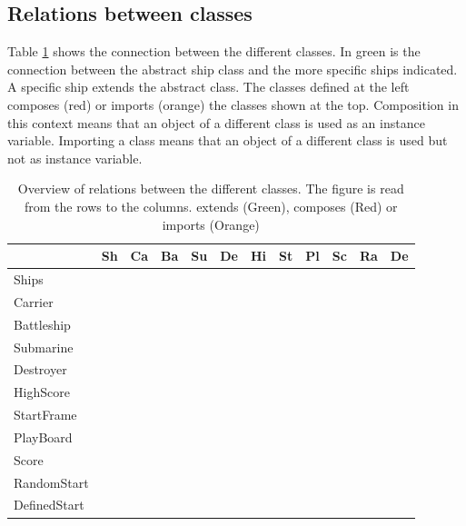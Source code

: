 \documentclass[a4paper,10pt]{article}
\begin{document}
\subsection{Relations between classes}
Table \ref{t:connectionClasses} shows the connection between the different classes. In green is the connection between the abstract ship class and the more specific ships indicated. A specific ship extends the abstract class. The classes defined at the left composes (red) or imports (orange) the classes shown at the top. Composition in this context means that an object of a different class is used as an instance variable. Importing a class means that an object of a different class is used but not as instance variable.

\newpage

\begin{table}[h!]
	\centering
	
	\begin{tabular}{|p{2cm}|p{1cm}|p{1cm}|p{1cm}|p{1cm}|p{1cm}|p{1cm}|p{1cm}|p{1cm}|p{1cm}|p{1cm}|p{1cm}|}
		\hline
		& \textbf{Sh} & \textbf{Ca}& \textbf{Ba} & \textbf{Su}& \textbf{De} & \textbf{Hi}& \textbf{St} & \textbf{Pl}& \textbf{Sc} & \textbf{Ra}& \textbf{De} \\ \hline
		Ships  &  &  & & & & & & & & & \\ \hline
		Carrier  &  \cellcolor{green!25} &  & & & & & & & & & \\ \hline
		Battleship  &  \cellcolor{green!25} &  & & & & & & & & & \\ \hline
		Submarine  &  \cellcolor{green!25} &  & & & & & & & & & \\ \hline
		Destroyer  &  \cellcolor{green!25} &  & & & & & & & & & \\ \hline
		HighScore  &   &  & & & & & & &\cellcolor{orange!25} & & \\ \hline
		StartFrame  &   &  & & & &\cellcolor{red!25} & &\cellcolor{orange!25} & & & \\ \hline
		PlayBoard  &\cellcolor{red!25}   &  & & & &\cellcolor{red!25} & & & \cellcolor{red!25}& \cellcolor{orange!25}& \cellcolor{orange!25}\\ \hline
		Score  &  \cellcolor{orange!25} &  & & & & & & & & & \\ \hline
		RandomStart  &  \cellcolor{red!25} &  & & & & & & & & & \\ \hline
		DefinedStart  &  \cellcolor{red!25} &  & & & & & & & & & \\ \hline
	\end{tabular}
	\caption{Overview of relations between the different classes. The figure is read from the rows to the columns. extends (Green), composes (Red) or imports (Orange)}
	\label{t:connectionClasses}
\end{table}
\end{document}
